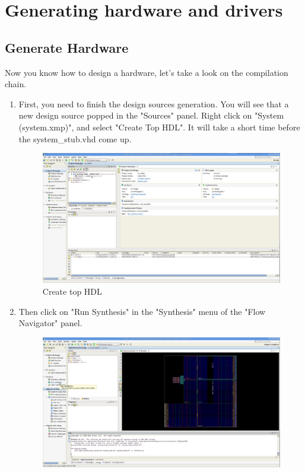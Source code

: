 \documentclass{article}
\begin{document}
	\section{Generating hardware and drivers}
		\subsection{Generate Hardware}
		Now you know how to design a hardware, let's take a look on the
		compilation chain.
		\begin{enumerate}
		\item First, you need to finish the design sources generation.
		You will see that a new design source popped in the "Sources" panel.
		Right click on "System (system.xmp)", and select "Create Top HDL".
		It will take a short time before the system\_stub.vhd come up.
	\begin{figure}
	\includegraphics[scale=0.25]{pictures/CreateTopHDL.png}
	\caption{Create top HDL}
	\end{figure}
		\item Then click on "Run Synthesis" in the "Synthesis" menu of the "Flow
		Navigator" panel.
	\begin{figure}
	\includegraphics[scale=0.25]{pictures/RunSynthesis.png}

\end{figure}
\end{enumerate}
\end{document}
